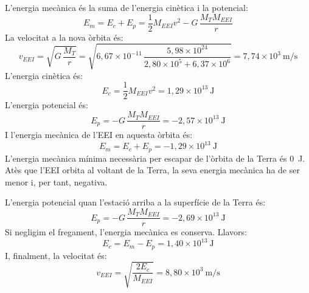 \begin{solapartat}
 L'energia mecànica és la suma de l'energia cinètica i la potencial:
\[ E_m = E_c + E_p = \frac{1}{2}M_{EEI}v^2 - G\,\frac{M_TM_{EEI}}{r} \]
 La velocitat a la nova òrbita és:
\[ v_{EEI} = \sqrt{G\,\frac{M_T}{r}} = \sqrt{6,67\times 10^{-11}\,\frac{5,98\times 10^{24}}{2,80\times 10^{5} + 6,37\times 10^{6}}} = 7,74\times 10^{3}\ \mathrm{m/s} \]
 L'energia cinètica és:
\[ E_c = \frac{1}{2}M_{EEI}v^2 = 1,29\times 10^{13}\ \mathrm{J} \]
 L'energia potencial és:
\[ E_p = -G\,\frac{M_TM_{EEI}}{r} = -2,57\times 10^{13}\ \mathrm{J} \]
 I l'energia mecànica de l'EEI en aquesta òrbita és:
\[ E_m = E_c + E_p = -1,29\times 10^{13}\ \mathrm{J} \]
 L'energia mecànica mínima necessària per escapar de l'òrbita de la Terra és 0~J. Atès que l'EEI orbita al voltant de la Terra, la seva energia mecànica ha de ser menor i, per tant, negativa.

 L'energia potencial quan l'estació arriba a la superfície de la Terra és:
\[ E_p = -G\,\frac{M_TM_{EEI}}{r} = -2,69\times 10^{13}\ \mathrm{J} \]
 Si negligim el fregament, l'energia mecànica es conserva. Llavors:
\[ E_c = E_m - E_p = 1,40\times 10^{13}\ \mathrm{J} \]
 I, finalment, la velocitat és:
\[ v_{EEI} = \sqrt{\frac{2E_c}{M_{EEI}}} = 8,80\times 10^{3}\ \mathrm{m/s} \]
\end{solapartat}
